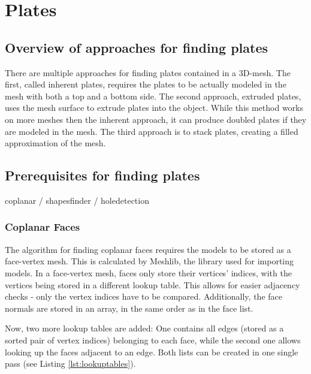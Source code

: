 \documentclass[../ClassicThesis.tex]{subfiles}
\begin{document}
\chapter{Plates}\label{ch:plates}

\section{Overview of approaches for finding plates}

There are multiple approaches for finding plates contained in a 3D-mesh. The first, called inherent plates, requires the plates to be actually modeled in the mesh with both a top and a bottom side. The second approach, extruded plates, uses the mesh surface to extrude plates into the object. While this method works on more meshes then the inherent approach, it can produce doubled plates if they are modeled in the mesh. The third approach is to stack plates, creating a filled approximation of the mesh.

\section{Prerequisites for finding plates}

coplanar / shapesfinder / holedetection

\subsection{Coplanar Faces}

The algorithm for finding coplanar faces requires the models to be stored as a face-vertex mesh. This is calculated by Meshlib, the library used for importing models. In a face-vertex mesh, faces only store their vertices' indices, with the vertices being stored in a different lookup table. This allows for easier adjacency checks - only the vertex indices have to be compared. Additionally, the face normals are stored in an array, in the same order as in the face list.

Now, two more lookup tables are added: One contains all edges (stored as a sorted pair of vertex indices) belonging to each face, while the second one allows looking up the faces adjacent to an edge. Both lists can be created in one single pass (see Listing \ref{lst:lookuptables}). 
\end{document}
